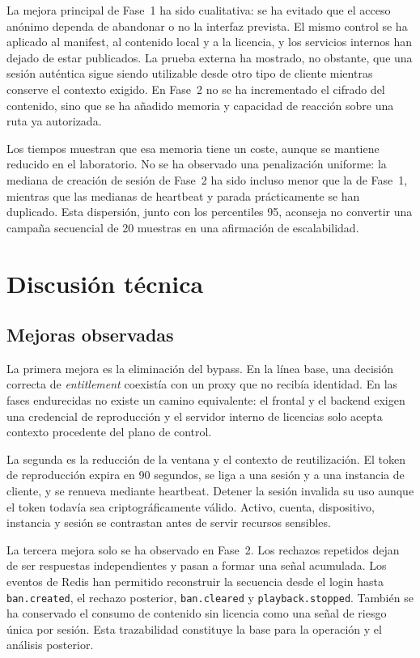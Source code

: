 La mejora principal de Fase~1 ha sido cualitativa: se ha evitado que el acceso anónimo dependa de abandonar o no la interfaz prevista. El mismo control se ha aplicado al manifest, al contenido local y a la licencia, y los servicios internos han dejado de estar publicados. La prueba externa ha mostrado, no obstante, que una sesión auténtica sigue siendo utilizable desde otro tipo de cliente mientras conserve el contexto exigido. En Fase~2 no se ha incrementado el cifrado del contenido, sino que se ha añadido memoria y capacidad de reacción sobre una ruta ya autorizada.

Los tiempos muestran que esa memoria tiene un coste, aunque se mantiene reducido en el laboratorio. No se ha observado una penalización uniforme: la mediana de creación de sesión de Fase~2 ha sido incluso menor que la de Fase~1, mientras que las medianas de heartbeat y parada prácticamente se han duplicado. Esta dispersión, junto con los percentiles 95, aconseja no convertir una campaña secuencial de 20 muestras en una afirmación de escalabilidad.

\section{Discusión técnica}

\subsection{Mejoras observadas}

La primera mejora es la eliminación del bypass. En la línea base, una decisión correcta de \textit{entitlement} coexistía con un proxy que no recibía identidad. En las fases endurecidas no existe un camino equivalente: el frontal y el backend exigen una credencial de reproducción y el servidor interno de licencias solo acepta contexto procedente del plano de control.

La segunda es la reducción de la ventana y el contexto de reutilización. El token de reproducción expira en 90 segundos, se liga a una sesión y a una instancia de cliente, y se renueva mediante heartbeat. Detener la sesión invalida su uso aunque el token todavía sea criptográficamente válido. Activo, cuenta, dispositivo, instancia y sesión se contrastan antes de servir recursos sensibles.

La tercera mejora solo se ha observado en Fase~2. Los rechazos repetidos dejan de ser respuestas independientes y pasan a formar una señal acumulada. Los eventos de Redis han permitido reconstruir la secuencia desde el login hasta \nolinkurl{ban.created}, el rechazo posterior, \nolinkurl{ban.cleared} y \nolinkurl{playback.stopped}. También se ha conservado el consumo de contenido sin licencia como una señal de riesgo única por sesión. Esta trazabilidad constituye la base para la operación y el análisis posterior.

